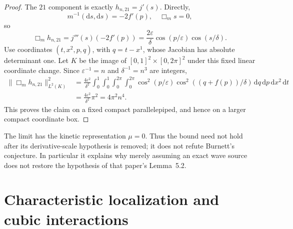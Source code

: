 \documentclass[11pt,a4paper]{article}
\numberwithin{equation}{section}
\newcommand{\dd}{\mathrm d}
\newcommand{\f}[2]{\frac{#1}{#2}}
\theoremstyle{definition}
\begin{document}
\begin{proof}
The $21$ component is exactly $h_{n,21}=j'(s)$. Directly,
\begin{equation*}
m^{-1}(\dd s,\dd s)=-2f'(p),\quad \Box_ms=0,
\end{equation*}
so
\begin{equation*}
\Box_mh_{n,21}=j'''(s)(-2f'(p))
=\f{2\varepsilon}{\delta}\cos(p/\varepsilon)\cos(s/\delta).
\end{equation*}
Use coordinates $(t,x^2,p,q)$, with $q=t-x^1$, whose Jacobian
has absolute determinant one. Let $K$ be the image of
$[0,1]^2\times[0,2\pi]^2$ under this fixed linear coordinate change.
Since $\varepsilon^{-1}=n$ and $\delta^{-1}=n^3$ are integers,
\begin{equation*}
\begin{aligned}
\|\Box_mh_{n,21}\|_{L^2(K)}^2
&=\f{4\varepsilon^2}{\delta^2}
 \int_0^1\int_0^1\int_0^{2\pi}\int_0^{2\pi}
 \cos^2(p/\varepsilon)\cos^2((q+f(p))/\delta)
 \,\dd q\,\dd p\,\dd x^2\,\dd t\\
&=\f{4\varepsilon^2}{\delta^2}\pi^2=4\pi^2n^4.
\end{aligned}
\end{equation*}
This proves the claim on a fixed compact parallelepiped, and hence on a larger compact coordinate box.
\end{proof}

The limit has the kinetic representation $\mu=0$. Thus the bound \cite[(3.16)]{HLwave} need not hold after its derivative-scale hypothesis is removed; it does not refute Burnett's conjecture. In particular it explains why merely assuming an exact wave source does not restore the hypothesis of that paper's Lemma~5.2.

\section{Characteristic localization and cubic interactions}\label{sec:cubic}
\end{document}
